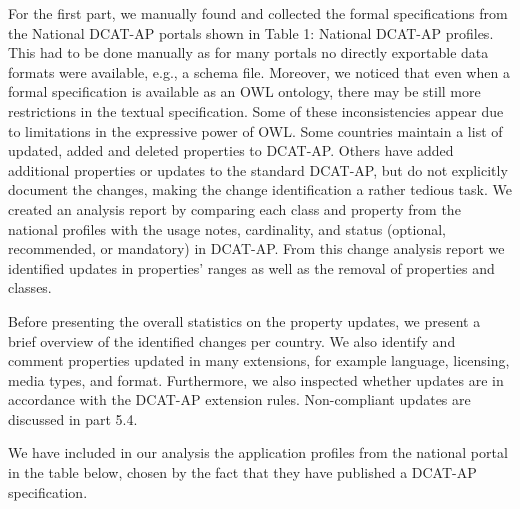 \documentclass[<options>]{elsarticle}
\begin{document}
For the first part, we manually found and collected the formal specifications from the National DCAT-AP portals shown in Table 1: National DCAT-AP profiles. This had to be done manually as for many portals no directly exportable data formats were available, e.g., a schema file. Moreover, we noticed that even when a formal specification is available as an OWL ontology, there may be still more restrictions in the textual specification. Some of these inconsistencies appear due to limitations in the expressive power of OWL. Some countries maintain a list of updated, added and deleted properties to DCAT-AP. Others have added additional properties or updates to the standard DCAT-AP, but do not explicitly document the changes, making the change identification a rather tedious task. We created an analysis report by comparing each class and property from the national profiles with the usage notes, cardinality, and status (optional, recommended, or mandatory) in DCAT-AP. From this change analysis report we identified updates in properties’ ranges as well as the removal of properties and classes.

Before presenting the overall statistics on the property updates, we present a brief overview of the identified changes per country. We also identify and comment properties updated in many extensions, for example language, licensing, media types, and format. Furthermore, we also inspected whether updates are in accordance with the DCAT-AP extension rules. Non-compliant updates are discussed in part 5.4.

We have included in our analysis the application profiles from the national portal in the table below, chosen by the fact that they have published a DCAT-AP specification. 
\end{document}
